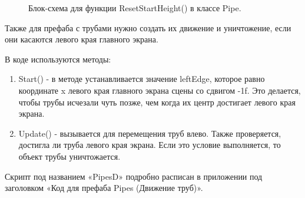 \documentclass[14pt, oneside]{altsu-report}
\begin{document}
\begin{enumerate}
\begin{figure}[H]
\caption{Блок-схема для функции ResetStartHeight() в классе Pipe.}
\end{figure}

\end{enumerate}

Также для префаба с трубами нужно создать их движение и уничтожение, если они касаются левого края главного экрана. 

В коде используются методы:

\begin{enumerate}
\item Start() - в методе устанавливается значение leftEdge, которое равно координате x левого края главного экрана сцены со сдвигом -1f. Это делается, чтобы трубы исчезали чуть позже, чем когда их центр достигает левого края экрана.
\item Update() - вызывается для перемещения труб влево. Также проверяется, достигла ли труба левого края экрана. Если это условие выполняется, то объект трубы уничтожается.
\end{enumerate} 

Скрипт под названием «PipesD» подробно расписан в приложении под заголовком «Код для префаба Pipes (Движение труб)».
\end{document}
